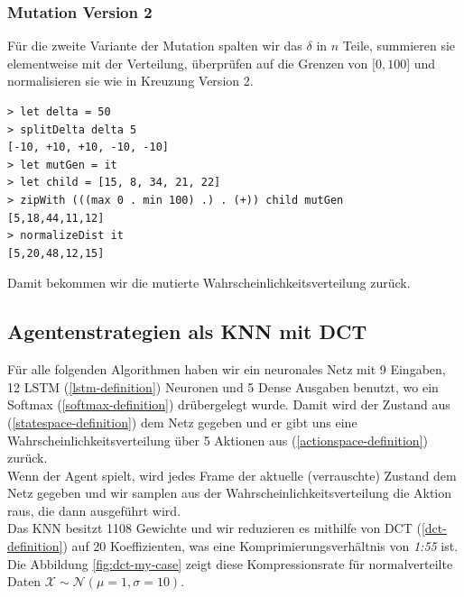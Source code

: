             \subsubsection*{Mutation Version 2}
            Für die zweite Variante der Mutation spalten wir das $\delta$ in $n$ Teile, summieren sie elementweise mit der Verteilung, überprüfen auf die Grenzen von [$0,100$] und normalisieren sie wie in Kreuzung Version 2.
            \begin{mdframed}
            \begin{verbatim}
> let delta = 50
> splitDelta delta 5
[-10, +10, +10, -10, -10]
> let mutGen = it
> let child = [15, 8, 34, 21, 22]
> zipWith (((max 0 . min 100) .) . (+)) child mutGen
[5,18,44,11,12]
> normalizeDist it
[5,20,48,12,15]
            \end{verbatim}
            \end{mdframed}
            Damit bekommen wir die mutierte Wahrscheinlichkeitsverteilung zurück.

\newpage

        \subsection{Agentenstrategien als KNN mit DCT} \label{knn-dct-impl}
        Für alle folgenden Algorithmen haben wir ein neuronales Netz mit 9 Eingaben, 12 LSTM (\ref{lstm-definition}) Neuronen und 5 Dense Ausgaben benutzt, wo ein Softmax (\ref{softmax-definition}) drübergelegt wurde. Damit wird der Zustand aus (\ref{statespace-definition}) dem Netz gegeben und er gibt uns eine Wahrscheinlichkeitsverteilung über 5 Aktionen aus (\ref{actionspace-definition}) zurück.\\[2mm]
        \noindent
        Wenn der Agent spielt, wird jedes Frame der aktuelle (verrauschte) Zustand dem Netz gegeben und wir samplen aus der Wahrscheinlichkeitsverteilung die Aktion raus, die dann ausgeführt wird. \\[2mm]
        \noindent
        Das KNN besitzt 1108 Gewichte und wir reduzieren es mithilfe von DCT (\ref{dct-definition}) auf 20 Koeffizienten, was eine Komprimierungsverhältnis von \textit{1:55} ist. Die Abbildung \ref{fig:dct-my-case} zeigt diese Kompressionsrate für normalverteilte Daten $ \mathcal{X} \sim \mathcal{N} (\mu = 1, \sigma = 10) $.\\

